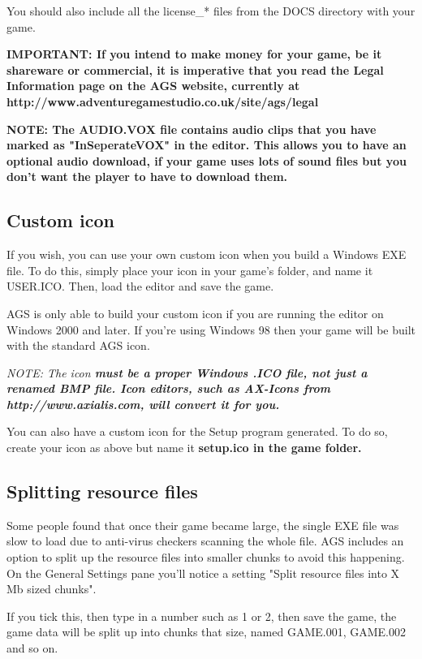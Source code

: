 You should also include all the license_* files from the DOCS directory with your game.

\bf{IMPORTANT:} If you intend to make money for your game, be it shareware or commercial,
it is imperative that you read the Legal Information page on the AGS website, currently
at http://www.adventuregamestudio.co.uk/site/ags/legal

\bf{NOTE:} The AUDIO.VOX file contains audio clips that you have marked as "InSeperateVOX"
in the editor. This allows you to have an optional audio download, if your game uses lots
of sound files but you don't want the player to have to download them.


\subsection{Custom icon}%

If you wish, you can use your own custom icon when you build a Windows EXE
file. To do this, simply place your icon in your game's folder, and name
it USER.ICO. Then, load the editor and save the game.

AGS is only able to build your custom icon if you are running the editor on
Windows 2000 and later. If you're using Windows 98 then your game will be
built with the standard AGS icon.

\it{NOTE: The icon \bf{must} be a proper Windows .ICO file, \bf{not} just a renamed
BMP file. Icon editors, such as AX-Icons from http://www.axialis.com, will convert
it for you.}

You can also have a custom icon for the Setup program generated. To do so, create
your icon as above but name it \bf{setup.ico} in the game folder.

\subsection{Splitting resource files}\label{SplitRes}%

Some people found that once their game became large, the single EXE file
was slow to load due to anti-virus checkers scanning the whole file.
AGS includes an option to split up the resource files into smaller chunks
to avoid this happening. On the General Settings pane you'll notice a
setting "Split resource files into X Mb sized chunks".

If you tick this, then type in a number such as 1 or 2, then save the game,
the game data will be split up into chunks that size, named GAME.001,
GAME.002 and so on.

